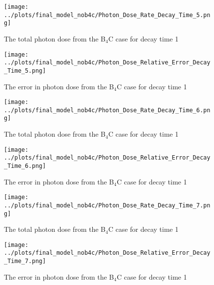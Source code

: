\begin{figure}[ht!]
\centering
\texttt{[image: ../plots/final\_model\_nob4c/Photon\_Dose\_Rate\_Decay\_Time\_5.png]}
\label{fig:photons_dc1_no4bc_flux}
\caption{The total photon dose from the B$_4$C case for decay time 1}
\end{figure}
\begin{figure}[ht!]
\centering
\texttt{[image: ../plots/final\_model\_nob4c/Photon\_Dose\_Relative\_Error\_Decay\_Time\_5.png]}
\label{fig:photons_dc1_no4bc_error}
\caption{The error in photon dose from the B$_4$C case for decay time 1}
\end{figure}
\begin{figure}[ht!]
\centering
\texttt{[image: ../plots/final\_model\_nob4c/Photon\_Dose\_Rate\_Decay\_Time\_6.png]}
\label{fig:photons_dc1_no4bc_flux}
\caption{The total photon dose from the B$_4$C case for decay time 1}
\end{figure}
\begin{figure}[ht!]
\centering
\texttt{[image: ../plots/final\_model\_nob4c/Photon\_Dose\_Relative\_Error\_Decay\_Time\_6.png]}
\label{fig:photons_dc1_no4bc_error}
\caption{The error in photon dose from the B$_4$C case for decay time 1}
\end{figure}
\begin{figure}[ht!]
\centering
\texttt{[image: ../plots/final\_model\_nob4c/Photon\_Dose\_Rate\_Decay\_Time\_7.png]}
\label{fig:photons_dc1_no4bc_flux}
\caption{The total photon dose from the B$_4$C case for decay time 1}
\end{figure}
\begin{figure}[ht!]
\centering
\texttt{[image: ../plots/final\_model\_nob4c/Photon\_Dose\_Relative\_Error\_Decay\_Time\_7.png]}
\label{fig:photons_dc1_no4bc_error}
\caption{The error in photon dose from the B$_4$C case for decay time 1}
\end{figure}
